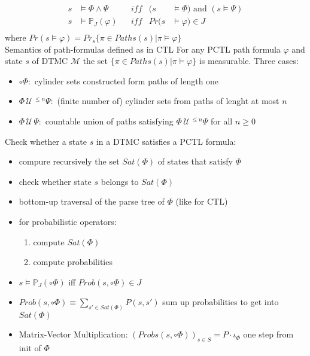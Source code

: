\documentclass[a4paper, 10pt]{article}
\newcommand{\until}{\,\mathcal{U}\,}
\begin{document}
\begin{mdframed}
\begin{align*}
s&\models \Phi\wedge\Psi && iff & (s&\models\Phi) \text{ and } (s\models\Psi)\\
s&\models \mathbb{P}_J(\varphi) && iff & Pr(s&\models\varphi)\in J\\
\end{align*}
where $Pr(s\models\varphi)=Pr_s\{\pi\in Paths(s)|\pi\models\varphi\}$ \\
Semantics of path-formulas defined as in CTL
For any PCTL path formula $\varphi$ and state $s$ of DTMC $\mathcal{M}$ the set $\{\pi\in Paths(s) | \pi\models\varphi\}$ is measurable. Three cases:
\begin{itemize}
    \item $\circ\Phi:$ cylinder sets constructed form paths of length one
    \item $\Phi\until^{\leq n}\Psi:$ (finite number of) cylinder sets from paths of lenght at most $n$
    \item $\Phi\until\Psi:$ countable union of paths satisfying $\Phi\until^{\leq n}\Psi$ for all $n\geq0$
\end{itemize}
Check whether a state $s$ in a DTMC satisfies a PCTL formula:
\begin{itemize}
    \item compure recursively the set $Sat(\Phi)$ of states that satisfy $\Phi$
    \item check whether state $s$ belongs to $Sat(\Phi)$
    \item[\follows] bottom-up traversal of the parse tree of $\Phi$ (like for CTL)
    \item for probabilistic operators:
    \begin{enumerate}
        \item compute $Sat(\Phi)$
        \item compute probabilities
    \end{enumerate}
\end{itemize}
\begin{itemize}
    \item $s\models\mathbb{P}_J(\circ\Phi)$ iff $Prob(s,\circ\Phi)\in J$
    \item $Prob(s,\circ\Phi)\equiv\displaystyle\sum_{s'\in Sat(\Phi)}P(s,s')$ {\tiny sum up probabilities to get into $Sat(\Phi)$}
    \item Matrix-Vector Multiplication: $(Probs(s,\circ\Phi))_{s\in S}=P\cdot\iota_\Phi$ {\tiny one step from init of $\Phi$}
\end{itemize}

\end{mdframed}
\end{document}
